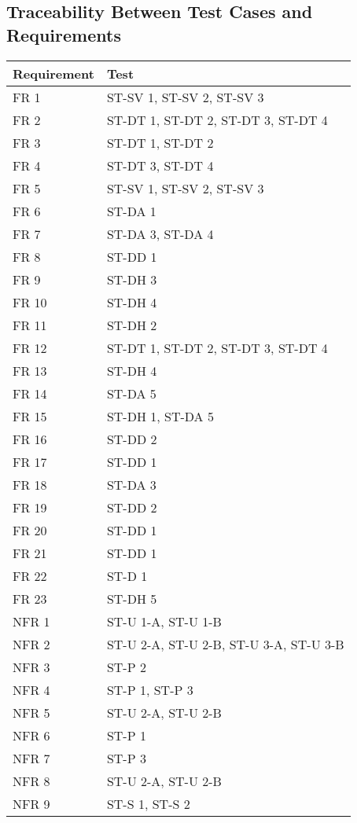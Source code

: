 \documentclass[12pt, titlepage]{article}
\begin{document}
\subsection{Traceability Between Test Cases and Requirements}
\begin{tabular}{| p{} | p{}|}
  \hline
  \rowcolor[gray]{0.9}
  Requirement & Test \\
  \hline
  FR 1 & ST-SV 1, ST-SV 2, ST-SV 3 \\
  \hline
  FR 2 & ST-DT 1, ST-DT 2, ST-DT 3, ST-DT 4 \\
  \hline
  FR 3 & ST-DT 1, ST-DT 2 \\
  \hline
  FR 4 & ST-DT 3, ST-DT 4 \\
  \hline
  FR 5 & ST-SV 1, ST-SV 2, ST-SV 3 \\
  \hline
  FR 6 & ST-DA 1 \\
  \hline
  FR 7 & ST-DA 3, ST-DA 4 \\
  \hline
  FR 8 & ST-DD 1 \\
  \hline
  FR 9 & ST-DH 3 \\
  \hline
  FR 10 & ST-DH 4 \\
  \hline
  FR 11 & ST-DH 2 \\
  \hline
  FR 12 & ST-DT 1, ST-DT 2, ST-DT 3, ST-DT 4 \\
  \hline
  FR 13 & ST-DH 4 \\
  \hline
  FR 14 & ST-DA 5 \\
  \hline
  FR 15 & ST-DH 1, ST-DA 5\\
  \hline
  FR 16 & ST-DD 2 \\
  \hline
  FR 17 & ST-DD 1 \\
  \hline
  FR 18 & ST-DA 3 \\
  \hline
  FR 19 & ST-DD 2 \\
  \hline
  FR 20 & ST-DD 1 \\
  \hline
  FR 21 & ST-DD 1 \\
  \hline
  FR 22 & ST-D 1 \\
  \hline
  FR 23 & ST-DH 5 \\
  \hline
  NFR 1 & ST-U 1-A, ST-U 1-B \\
  \hline
  NFR 2 & ST-U 2-A, ST-U 2-B, ST-U 3-A, ST-U 3-B \\
  \hline
  NFR 3 & ST-P 2 \\
  \hline
  NFR 4 & ST-P 1, ST-P 3 \\
  \hline
  NFR 5 & ST-U 2-A, ST-U 2-B \\
  \hline
  NFR 6 & ST-P 1 \\
  \hline
  NFR 7 & ST-P 3 \\
  \hline
  NFR 8 & ST-U 2-A, ST-U 2-B \\
  \hline
  NFR 9 & ST-S 1, ST-S 2 \\
  \hline
\end{tabular}
\end{document}
